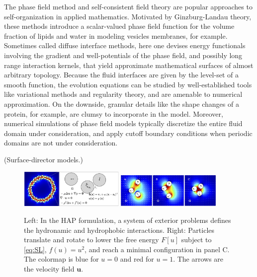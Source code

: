 The phase field method and self-consistent field theory are popular  
approaches to self-organization in applied mathematics.
Motivated by Ginzburg-Landau theory, these methods introduce a scalar-valued
phase field function for the volume fraction of
lipids and water in modeling vesicles membranes, for example. 
Sometimes called diffuse interface methods, here one devises energy functionals
involving the gradient and well-potentials of the phase field, and possibly
long range interaction kernels, that yield approximate mathematical surfaces
of almost arbitrary topology.
Because the fluid interfaces are given by the level-set
of a smooth function, the evolution equations
can be studied by well-established tools like variational methods
and regularity theory, and are amenable to numerical approximation.
On the downside, granular details like the shape changes of a protein, for
example, are clumsy to incorporate in the model.  Moreover, numerical
simulations of phase field models typically discretize the entire fluid
domain under consideration, and apply cutoff boundary conditions
when periodic domains are not under consideration. 

(Surface-director models.)

\begin{figure}
  \begin{center}
    \includegraphics[width=0.45\textwidth]{figures/SpecificAim1/Domain.jpg}
 \includegraphics[width=0.45\textwidth]{figures/SpecificAim1/3Particles.jpg}
  \end{center}
  \caption{\label{fig:flow_map}
   Left: In the HAP formulation,
   a system of exterior problems 
   defines the hydronamic and hydrophobic interactions.
  Right:
     Particles translate and rotate to lower the free energy $F[u]$
   subject to \eqref{eq:SL}, $f(u) = u^2$, and reach a minimal configuration in
   panel C. The colormap is blue for $u = 0$ and red for $u = 1$.
   The arrows are the velocity field $\mathbf{u}$.}
\end{figure}


